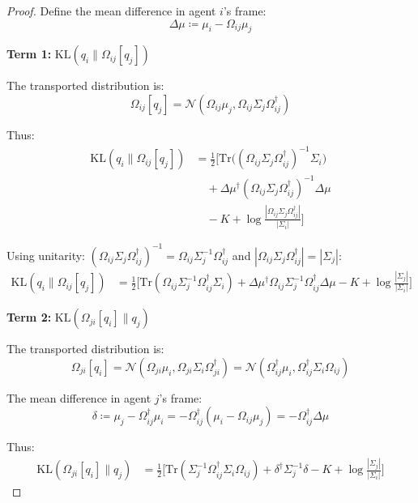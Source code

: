 \documentclass[11pt,a4paper]{article}
\newcommand{\KL}{\mathrm{KL}}
\newcommand{\Tr}{\mathrm{Tr}}
\newcommand{\Gauss}{\mathcal{N}}
\begin{document}
\begin{proof}
Define the mean difference in agent $i$'s frame:
\begin{equation}
    \Delta\mu \coloneqq \mu_i - \Omega_{ij} \mu_j
\end{equation}

\textbf{Term 1:} $\KL(q_i \| \Omega_{ij}[q_j])$

The transported distribution is:
\begin{equation}
    \Omega_{ij}[q_j] = \Gauss(\Omega_{ij}\mu_j, \Omega_{ij}\Sigma_j\Omega_{ij}^\dagger)
\end{equation}

Thus:
\begin{align}
    \KL(q_i \| \Omega_{ij}[q_j]) &= \frac{1}{2}\Big[
        \Tr\big((\Omega_{ij}\Sigma_j\Omega_{ij}^\dagger)^{-1} \Sigma_i\big) \\
        &\quad + \Delta\mu^\dagger (\Omega_{ij}\Sigma_j\Omega_{ij}^\dagger)^{-1} \Delta\mu \\
        &\quad - K + \log\frac{|\Omega_{ij}\Sigma_j\Omega_{ij}^\dagger|}{|\Sigma_i|}
    \Big] \nonumber
\end{align}

Using unitarity: $(\Omega_{ij}\Sigma_j\Omega_{ij}^\dagger)^{-1} = \Omega_{ij}\Sigma_j^{-1}\Omega_{ij}^\dagger$ and $|\Omega_{ij}\Sigma_j\Omega_{ij}^\dagger| = |\Sigma_j|$:
\begin{align}
    \KL(q_i \| \Omega_{ij}[q_j]) &= \frac{1}{2}\Big[
        \Tr(\Omega_{ij}\Sigma_j^{-1}\Omega_{ij}^\dagger \Sigma_i) +
        \Delta\mu^\dagger \Omega_{ij}\Sigma_j^{-1}\Omega_{ij}^\dagger \Delta\mu -
        K + \log\frac{|\Sigma_j|}{|\Sigma_i|}
    \Big]
\end{align}

\textbf{Term 2:} $\KL(\Omega_{ji}[q_i] \| q_j)$

The transported distribution is:
\begin{equation}
    \Omega_{ji}[q_i] = \Gauss(\Omega_{ji}\mu_i, \Omega_{ji}\Sigma_i\Omega_{ji}^\dagger) = \Gauss(\Omega_{ij}^\dagger\mu_i, \Omega_{ij}^\dagger\Sigma_i\Omega_{ij})
\end{equation}

The mean difference in agent $j$'s frame:
\begin{equation}
    \delta \coloneqq \mu_j - \Omega_{ij}^\dagger\mu_i = -\Omega_{ij}^\dagger(\mu_i - \Omega_{ij}\mu_j) = -\Omega_{ij}^\dagger \Delta\mu
\end{equation}

Thus:
\begin{align}
    \KL(\Omega_{ji}[q_i] \| q_j) &= \frac{1}{2}\Big[
        \Tr(\Sigma_j^{-1} \Omega_{ij}^\dagger\Sigma_i\Omega_{ij}) +
        \delta^\dagger \Sigma_j^{-1} \delta -
        K + \log\frac{|\Sigma_j|}{|\Sigma_i|}
    \Big]
\end{align}


\end{proof}
\end{document}

